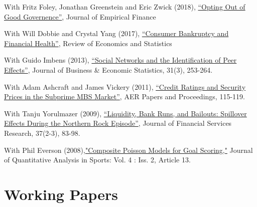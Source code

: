 \documentclass[letterpaper]{article}
\renewenvironment{itemize}{
  \begin{list}{}
    { \setlength{\itemsep}{5pt}
      \setlength{\parsep}{0pt}
      \setlength{\topsep}{0pt}
      \setlength{\leftmargin}{0em} } }{
  \end{list}}
\begin{document}
\begin{itemize}
\item With Fritz Foley, Jonathan Greenstein and Eric Zwick (2018), \href{http://www.nber.org/papers/w19953}{``Opting Out of Good Governence''}, Journal of Empirical Finance
\item With Will Dobbie and Crystal Yang (2017), \href{http://www.nber.org/papers/w21032}{``Consumer Bankruptcy and Financial Health''}, Review of Economics and Statistics
\item With Guido Imbens (2013), \href{http://www.tandfonline.com/doi/pdf/10.1080/07350015.2013.801251}{``Social Networks and the Identification of Peer Effects''}, Journal of Business \& Economic Statistics, 31(3), 253-264.
\item With Adam Ashcraft and James Vickery (2011), \href{http://papers.ssrn.com.ezp-prod1.hul.harvard.edu/sol3/papers.cfm?abstract_id=1856823}{``Credit Ratings
    and Security Prices in the Subprime MBS Market''}, AER Papers and Proceedings,  115-119. 
\item With Tanju Yorulmazer (2009), \href{http://www.springerlink.com/content/ww187761jgr660q5/}{``Liquidity, Bank Runs, and Bailouts: Spillover Effects During the Northern Rock Episode''}, Journal of Financial Services Research, 37(2-3), 83-98. 
\item With Phil Everson (2008),\href{http://www.bepress.com/jqas/vol4/iss2/13/}{"Composite Poisson Models for Goal Scoring,"} Journal of Quantitative Analysis in Sports: Vol. 4 : Iss. 2, Article 13.
\end{itemize}

\section*{Working Papers}
\end{document}
